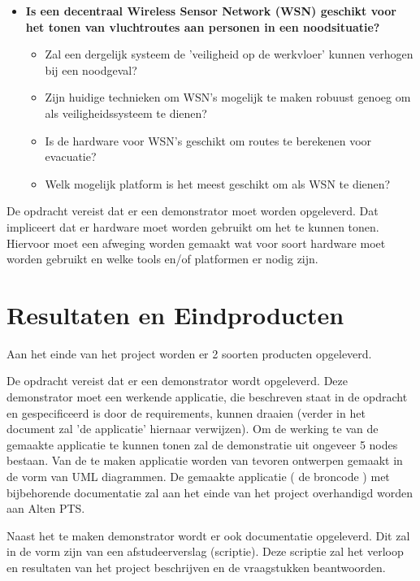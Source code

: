 \documentclass{../local}
\begin{document}
\begin{itemize}
\item \textbf{Is een decentraal Wireless Sensor Network (WSN) geschikt voor het tonen van vluchtroutes aan personen in een noodsituatie?} 
\begin{itemize}
\item Zal een dergelijk systeem de 'veiligheid op de werkvloer' kunnen verhogen bij een noodgeval?
\item Zijn huidige technieken om WSN's mogelijk te maken robuust genoeg om als veiligheidssysteem te dienen?
\item Is de hardware voor WSN's geschikt om routes te berekenen voor evacuatie?
\item Welk mogelijk platform is het meest geschikt om als WSN te dienen?
\end{itemize}
\end{itemize}

De opdracht vereist dat er een demonstrator moet worden opgeleverd. Dat impliceert dat er hardware moet worden gebruikt om het te kunnen tonen. Hiervoor moet een afweging worden gemaakt wat voor soort hardware moet worden gebruikt en welke tools en/of platformen er nodig zijn.

\section{Resultaten en Eindproducten}
Aan het einde van het project worden er 2 soorten producten opgeleverd.

De opdracht vereist dat er een demonstrator wordt opgeleverd. Deze demonstrator moet een werkende applicatie, die beschreven staat in de opdracht en gespecificeerd is door de requirements, kunnen draaien (verder in het document zal 'de applicatie' hiernaar verwijzen). Om de werking te van de gemaakte applicatie te kunnen tonen zal de demonstratie uit ongeveer 5 nodes bestaan. Van de te maken applicatie worden van tevoren ontwerpen gemaakt in de vorm van UML diagrammen. De gemaakte applicatie ( de broncode ) met bijbehorende documentatie zal aan het einde van het project overhandigd worden aan Alten PTS.

Naast het te maken demonstrator wordt er ook documentatie opgeleverd. Dit zal in de vorm zijn van een afstudeerverslag (scriptie). Deze scriptie zal het verloop en resultaten van het project beschrijven en de vraagstukken beantwoorden.
\end{document}
